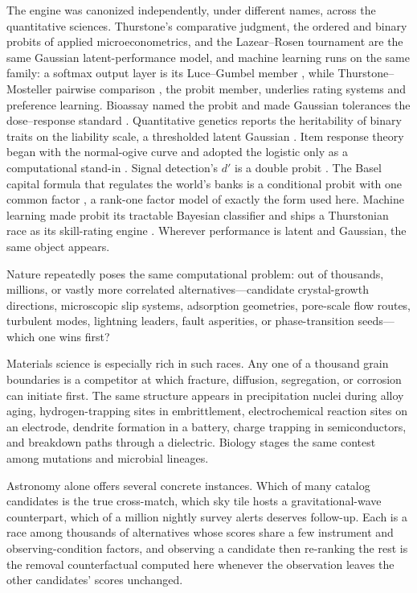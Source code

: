 \documentclass[12pt]{article}
\theoremstyle{remark}
\begin{document}
The engine was canonized independently, under different names, across
the quantitative sciences. Thurstone's comparative judgment, the
ordered and binary probits of applied microeconometrics, and the
Lazear--Rosen tournament \citep{lazear1981} are the same Gaussian
latent-performance model, and machine learning runs on the same family:
a softmax output layer is its Luce--Gumbel member
\citep{luce1959,yellott1977}, while Thurstone--Mosteller pairwise
comparison \citep{mosteller1951}, the probit member, underlies rating
systems and preference learning. Bioassay named the probit and made
Gaussian tolerances the dose--response standard
\citep{bliss1934,finney1947}. Quantitative genetics reports the
heritability of binary traits on the liability scale, a thresholded
latent Gaussian \citep{dempster1950,falconer1965}. Item response theory
began with the normal-ogive curve and adopted the logistic only as a
computational stand-in \citep{lord1952}. Signal detection's $d'$ is a
double probit \citep{green1966}. The Basel capital formula that
regulates the world's banks is a conditional probit with one common
factor \citep{vasicek2002,gordy2003}, a rank-one factor model of
exactly the form used here. Machine learning made probit its tractable
Bayesian classifier \citep{albertchib1993} and ships a Thurstonian race
as its skill-rating engine \citep{herbrich2006}. Wherever performance
is latent and Gaussian, the same object appears.

Nature repeatedly poses the same computational problem: out of thousands, millions, or vastly more correlated alternatives---candidate crystal-growth directions, microscopic slip systems, adsorption geometries, pore-scale flow routes, turbulent modes, lightning leaders, fault asperities, or phase-transition seeds---which one wins first?

Materials science is especially rich in such races. Any one of a
thousand grain boundaries is a competitor at which fracture, diffusion,
segregation, or corrosion can initiate first. The same structure
appears in precipitation nuclei during alloy aging, hydrogen-trapping
sites in embrittlement, electrochemical reaction sites on an electrode,
dendrite formation in a battery, charge trapping in semiconductors, and
breakdown paths through a dielectric. Biology stages the same contest
among mutations and microbial lineages.

Astronomy alone offers several concrete instances. Which of many
catalog candidates is the true cross-match, which sky tile hosts a
gravitational-wave counterpart, which of a million nightly survey
alerts deserves follow-up. Each is a race among thousands of
alternatives whose scores share a few instrument and observing-condition
factors, and observing a candidate then re-ranking the rest is the
removal counterfactual computed here whenever the observation leaves
the other candidates' scores unchanged.
\end{document}
